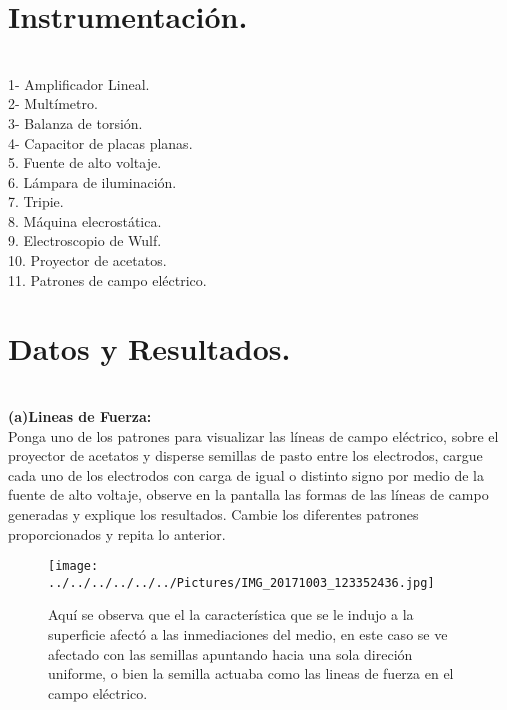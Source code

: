 \documentclass[11pt,a4paper]{article}
\begin{document}
\section{Instrumentaci\'{o}n.}\\
1- Amplificador Lineal.\\
2- Mult\'{i}metro.\\
3- Balanza de torsi\'{o}n. \\
4- Capacitor de placas planas. \\
5. Fuente de alto voltaje.\\
6. L\'{a}mpara de iluminaci\'{o}n.\\
7. Tripie.\\
8. M\'{a}quina elecrost\'{a}tica.\\
9. Electroscopio de Wulf.\\
10. Proyector de acetatos.\\
11. Patrones de campo el\'{e}ctrico.\\



\section{Datos y Resultados.}\\

\textbf{(a)Lineas de Fuerza:}\\
Ponga uno de los patrones para visualizar las l\'{i}neas de campo el\'{e}ctrico, sobre el proyector de acetatos y disperse semillas de pasto entre los electrodos, cargue cada uno de los electrodos con carga de igual o distinto signo por medio de la fuente de alto voltaje, observe en la pantalla las formas de las l\'{i}neas de campo generadas y explique los resultados. Cambie los diferentes patrones proporcionados y repita lo anterior.

\begin{figure}[hbtp]
\centering 
\texttt{[image: ../../../../../../Pictures/IMG\_20171003\_123352436.jpg]} 
\caption{Aqu\'{i} se observa que el la caracter\'{i}stica que se le indujo a la superficie afect\'{o} a las inmediaciones del medio, en este caso se ve afectado con las semillas apuntando hacia una sola direci\'{o}n uniforme, o bien la semilla actuaba como las lineas de fuerza en el campo el\'{e}ctrico.}
\end{figure}
\end{document}

